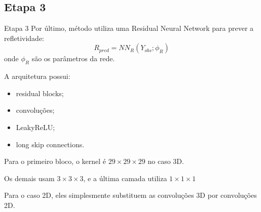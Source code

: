 \subsection{Etapa 3}
\begin{frame}{Etapa 3}
    Por último, método utiliza uma Residual Neural Network para prever a refletividade:
    \begin{equation}
        R_{pred} = NN_R (Y_{obs};\phi_R)
    \end{equation}
    onde \(\phi_R\) são os parâmetros da rede.

    A arquitetura possui:
    \begin{itemize}
        \item residual blocks;
        \item convoluções;
        \item LeakyReLU;
        \item long skip connections.
    \end{itemize}
    Para o primeiro bloco, o kernel é $29\times29\times29$ no caso 3D.

Os demais usam $3\times3\times3$, e a última camada utiliza $1\times1\times1$

Para o caso 2D, eles simplesmente substituem as convoluções 3D por convoluções 2D.
\end{frame}